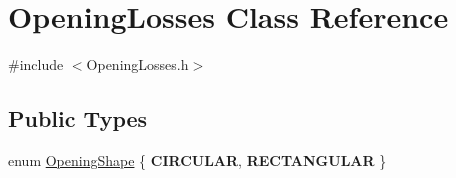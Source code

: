\hypertarget{class_opening_losses}{}\section{Opening\+Losses Class Reference}
\label{class_opening_losses}


{\ttfamily \#include $<$Opening\+Losses.\+h$>$}

\subsection*{Public Types}
\begin{DoxyCompactItemize}
\item 
enum \hyperlink{class_opening_losses_a57f9759b6fd72a1b75aa885800e26157}{Opening\+Shape} \{ {\bfseries C\+I\+R\+C\+U\+L\+AR}, 
{\bfseries R\+E\+C\+T\+A\+N\+G\+U\+L\+AR}
 \}
\end{DoxyCompactItemize}

